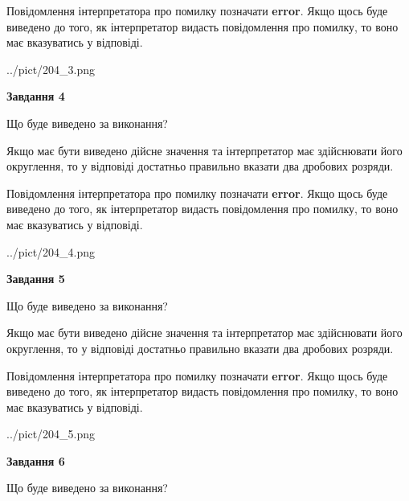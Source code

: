 \documentclass[12pt, ukrainian]{article}
\begin{document}
{\begin {Large}
Повідомлення інтерпретатора про помилку позначати \textbf{error}.
Якщо щось буде виведено до того, як інтерпретатор видасть повідомлення про помилку, 
то воно має вказуватись у відповіді. \par

\begin{center}
	{../pict/204_3.png}
\end{center}
\newpage

{\begin {center}\textbf{Завдання 4}\end {center}}\par
Що буде виведено за виконання? \par

Якщо має бути виведено дійсне значення та інтерпретатор має здійснювати його округлення, 
то у відповіді достатньо правильно вказати два дробових розряди.

Повідомлення інтерпретатора про помилку позначати \textbf{error}.
Якщо щось буде виведено до того, як інтерпретатор видасть повідомлення про помилку, 
то воно має вказуватись у відповіді. \par

\begin{center}
	{../pict/204_4.png}
\end{center}
\newpage

{\begin {center}\textbf{Завдання 5}\end {center}}\par
Що буде виведено за виконання? \par

Якщо має бути виведено дійсне значення та інтерпретатор має здійснювати його округлення, 
то у відповіді достатньо правильно вказати два дробових розряди.

Повідомлення інтерпретатора про помилку позначати \textbf{error}.
Якщо щось буде виведено до того, як інтерпретатор видасть повідомлення про помилку, 
то воно має вказуватись у відповіді. \par

\begin{center}
	{../pict/204_5.png}
\end{center}
\newpage

{\begin {center}\textbf{Завдання 6}\end {center}}\par
Що буде виведено за виконання? \par


\end{Large}}
\end{document}
